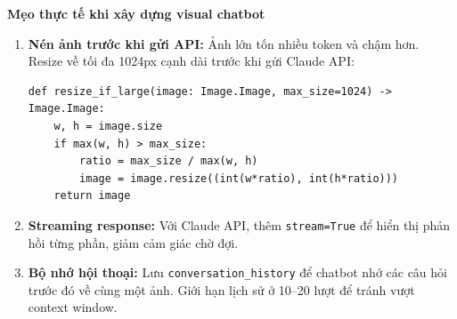 \begin{mdframed}[style=infobox]
\textbf{Mẹo thực tế khi xây dựng visual chatbot}

\begin{enumerate}
    \item \textbf{Nén ảnh trước khi gửi API:} Ảnh lớn tốn nhiều token và chậm hơn. Resize về tối đa 1024px cạnh dài trước khi gửi Claude API:
\begin{verbatim}
def resize_if_large(image: Image.Image, max_size=1024) -> Image.Image:
    w, h = image.size
    if max(w, h) > max_size:
        ratio = max_size / max(w, h)
        image = image.resize((int(w*ratio), int(h*ratio)))
    return image
\end{verbatim}
    \item \textbf{Streaming response:} Với Claude API, thêm \texttt{stream=True} để hiển thị phản hồi từng phần, giảm cảm giác chờ đợi.
    \item \textbf{Bộ nhớ hội thoại:} Lưu \texttt{conversation\_history} để chatbot nhớ các câu hỏi trước đó về cùng một ảnh. Giới hạn lịch sử ở 10--20 lượt để tránh vượt context window.
\end{enumerate}
\end{mdframed}

